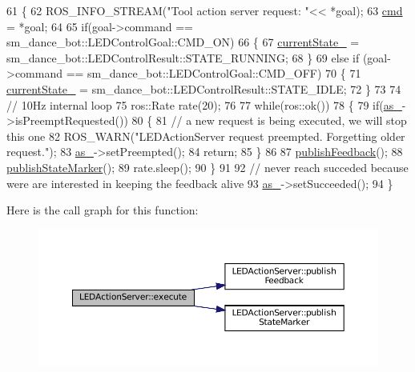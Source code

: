 \begin{DoxyCode}
61 \{
62   ROS\_INFO\_STREAM(\textcolor{stringliteral}{"Tool action server request: "}<< *goal);
63   \hyperlink{classLEDActionServer_a4d3a4c07e7659cdd78228932bb1634d3}{cmd} = *goal;
64 
65   \textcolor{keywordflow}{if}(goal->command == sm\_dance\_bot::LEDControlGoal::CMD\_ON)
66   \{
67     \hyperlink{classLEDActionServer_a1dc456e987dc331501ad6ff2215661ff}{currentState\_} =  sm\_dance\_bot::LEDControlResult::STATE\_RUNNING;
68   \}
69   \textcolor{keywordflow}{else}  \textcolor{keywordflow}{if} (goal->command == sm\_dance\_bot::LEDControlGoal::CMD\_OFF)
70   \{
71     \hyperlink{classLEDActionServer_a1dc456e987dc331501ad6ff2215661ff}{currentState\_} =  sm\_dance\_bot::LEDControlResult::STATE\_IDLE;
72   \}
73 
74   \textcolor{comment}{// 10Hz internal loop}
75   ros::Rate rate(20);
76 
77   \textcolor{keywordflow}{while}(ros::ok())
78   \{
79     \textcolor{keywordflow}{if}(\hyperlink{classLEDActionServer_a61d21c77642081acf017d4ebd65b2de0}{as\_}->isPreemptRequested())
80     \{
81        \textcolor{comment}{// a new request is being executed, we will stop this one}
82        ROS\_WARN(\textcolor{stringliteral}{"LEDActionServer request preempted. Forgetting older request."});
83        \hyperlink{classLEDActionServer_a61d21c77642081acf017d4ebd65b2de0}{as\_}->setPreempted(); 
84        \textcolor{keywordflow}{return};
85     \}
86     
87     \hyperlink{classLEDActionServer_a25c93d4e7ecdacbb4f5b090d7789aa36}{publishFeedback}();
88     \hyperlink{classLEDActionServer_a73bb754ac2347c50660624ad92315895}{publishStateMarker}();
89     rate.sleep();
90   \}
91 
92    \textcolor{comment}{// never reach succeded because were are interested in keeping the feedback alive}
93    \hyperlink{classLEDActionServer_a61d21c77642081acf017d4ebd65b2de0}{as\_}->setSucceeded();
94 \}
\end{DoxyCode}
Here is the call graph for this function\+:
\nopagebreak
\begin{figure}[H]
\begin{center}
\leavevmode
\includegraphics[width=350pt]{classLEDActionServer_a2d8b9dfca1912e24170ef69a5edf5e9b_cgraph}
\end{center}
\end{figure}
